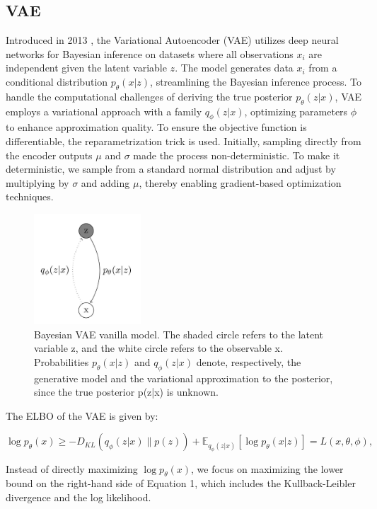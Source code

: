 \documentclass{article}
\begin{document}
\subsection{VAE}
Introduced in 2013 \cite{kingma2013auto}, the Variational Autoencoder (VAE) utilizes deep neural networks for Bayesian inference on datasets where all observations \(x_i\) are independent given the latent variable \(z\). The model generates data \(x_i\) from a conditional distribution \(p_\theta(x|z)\), streamlining the Bayesian inference process. To handle the computational challenges of deriving the true posterior \(p_\theta(z|x)\), VAE employs a variational approach with a family \(q_\phi(z|x)\), optimizing parameters \(\phi\) to enhance approximation quality. To ensure the objective function is differentiable, the reparametrization trick is used. Initially, sampling directly from the encoder outputs \(\mu\) and \(\sigma\) made the process non-deterministic. To make it deterministic,  we sample from a standard normal distribution and adjust by multiplying by \(\sigma\) and adding \(\mu\), thereby enabling gradient-based optimization techniques.

\begin{figure}[H]
    \centering
    \includegraphics[width=4cm]{figures/VAE.png}
    \caption{Bayesian VAE vanilla model. The shaded circle refers to the latent variable z, and the white circle refers to the observable x. Probabilities \(p_\theta(x|z)\) and \(q_\phi(z|x)\) denote, respectively, the generative model and the variational approximation to the posterior, since the true posterior p(z|x) is unknown.}
    \label{VAE}
\end{figure}

The ELBO of the VAE is given by:

\begin{equation}
    \log p_\theta(x) \geq -D_{KL}(q_\phi(z|x) \parallel p(z)) + \mathbb{E}_{q_\phi(z|x)}[\log p_\theta(x|z)] = L(x, \theta, \phi),
\end{equation}

Instead of directly maximizing \(\log p_\theta(x)\), we focus on maximizing the lower bound on the right-hand side of Equation 1, which includes the Kullback-Leibler divergence and the log likelihood.
\end{document}
